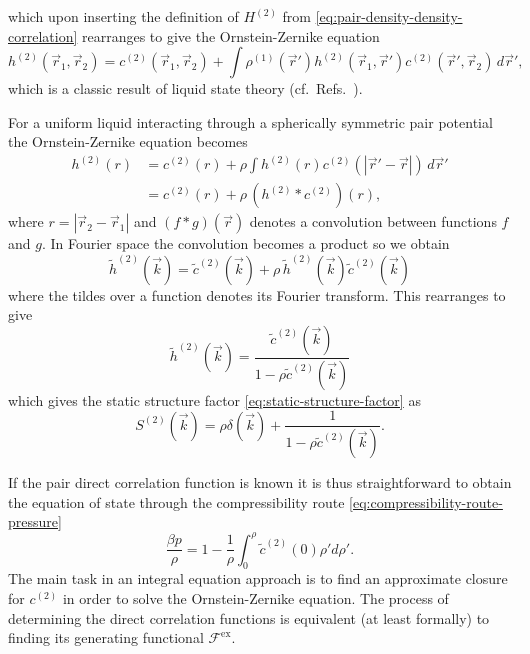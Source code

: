 which upon inserting the definition of $H^{(2)}$ from \eqref{eq:pair-density-density-correlation} rearranges to give the Ornstein-Zernike equation
\begin{equation}\label{eq:ornstein-zernike-generic}
  h^{(2)}(\vec{r}_1, \vec{r}_2) =
  c^{(2)}(\vec{r}_1, \vec{r}_2) +
  \int
  \rho^{(1)}(\vec{r}')
  h^{(2)}(\vec{r}_1, \vec{r}')
  c^{(2)}(\vec{r}', \vec{r}_2)
  \, d\vec{r}',
\end{equation}
which is a classic result of liquid state theory (cf.\ Refs.\ \cite{OrnsteinPAS1914,Hansen2013,EvansAP1979}).

\vspace{0.5em}
\begin{tcolorbox}[title=Ornstein-Zernike equation for a uniform simple liquid]
For a uniform liquid interacting through a spherically symmetric pair potential the Ornstein-Zernike equation becomes
\begin{equation}\label{eq:ornstein-zernike-spherical}
  \begin{split}
    h^{(2)}(r)
    &=
    c^{(2)}(r) +
    \rho
    \int
    h^{(2)}(r)
    c^{(2)}(|\vec{r}' - \vec{r}|)
    \, d\vec{r}'
    \\ &=
    c^{(2)}(r) + \rho \, (h^{(2)} * c^{(2)})(r),
  \end{split}
\end{equation}
where $r = |\vec{r}_2 - \vec{r}_1|$ and $(f*g)(\vec{r})$ denotes a convolution between functions $f$ and $g$.
In Fourier space the convolution becomes a product so we obtain
\begin{equation*}
  \tilde{h}^{(2)}(\vec{k})
  =
  \tilde{c}^{(2)}(\vec{k}) +
  \rho \, \tilde{h}^{(2)}(\vec{k}) \tilde{c}^{(2)}(\vec{k})
\end{equation*}
where the tildes over a function denotes its Fourier transform.
This rearranges to give
\begin{equation*}
  \tilde{h}^{(2)}(\vec{k})
  =
  \frac{\tilde{c}^{(2)}(\vec{k})}{1 - \rho \tilde{c}^{(2)}(\vec{k})}
\end{equation*}
which gives the static structure factor \eqref{eq:static-structure-factor} as
\begin{equation*}
  S^{(2)}(\vec{k})
  =
  \rho \delta(\vec{k}) +
  \frac{1}{1 - \rho \tilde{c}^{(2)}(\vec{k})}.
\end{equation*}
\end{tcolorbox}

If the pair direct correlation function is known it is thus straightforward to obtain the equation of state through the compressibility route \eqref{eq:compressibility-route-pressure}
\begin{equation*}
  \frac{\beta p}{\rho}
  =
  1 - \frac{1}{\rho} \int_0^\rho \tilde{c}^{(2)}(0) \rho' d\rho'.
\end{equation*}
The main task in an integral equation approach is to find an approximate closure for $c^{(2)}$ in order to solve the Ornstein-Zernike equation.
The process of determining the direct correlation functions is equivalent (at least formally) to finding its generating functional $\mathcal{F}^\mathrm{ex}$.

